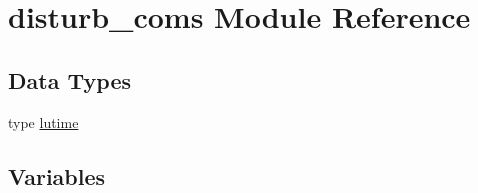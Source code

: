 \hypertarget{namespacedisturb__coms}{}\section{disturb\+\_\+coms Module Reference}
\label{namespacedisturb__coms}
\subsection*{Data Types}
\begin{DoxyCompactItemize}
\item 
type \hyperlink{structdisturb__coms_1_1lutime}{lutime}
\end{DoxyCompactItemize}
\subsection*{Variables}
